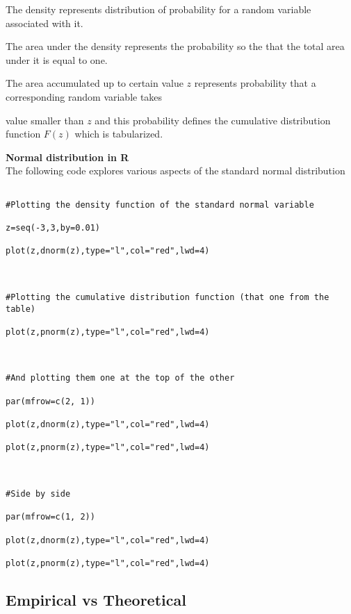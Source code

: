  

The density represents distribution of probability for a random variable associated with it.

The area under the density represents the probability so the that the total area under it is equal to one.

The area accumulated up to certain value $z$ represents probability that a corresponding random variable takes

value smaller than $z$ and this probability defines the cumulative distribution function $F(z)$ which is tabularized.

 



\textbf{Normal distribution in R}\\

The following code explores various aspects of the standard normal distribution

 

\begin{verbatim}

#Plotting the density function of the standard normal variable

z=seq(-3,3,by=0.01)

plot(z,dnorm(z),type="l",col="red",lwd=4)

 

#Plotting the cumulative distribution function (that one from the table)

plot(z,pnorm(z),type="l",col="red",lwd=4)

 

#And plotting them one at the top of the other

par(mfrow=c(2, 1))

plot(z,dnorm(z),type="l",col="red",lwd=4)

plot(z,pnorm(z),type="l",col="red",lwd=4)

 

#Side by side

par(mfrow=c(1, 2))

plot(z,dnorm(z),type="l",col="red",lwd=4)

plot(z,pnorm(z),type="l",col="red",lwd=4)

\end{verbatim}

 

\subsection{Empirical vs Theoretical}

